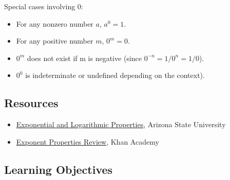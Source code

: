 Special cases involving 0:



\begin{itemize}
    \item For any nonzero number $a$, $a^0 = 1$.
    \item For any positive number $m$, $0^m = 0$.
    \item $0^m$ does not exist if m is negative (since $0^{-n} = 1/0^n = 1/0$).
    \item $0^0$ is indeterminate or undefined depending on the context).
\end{itemize}


\subsection{Resources}
\label{sss:reso-55b5}




\begin{itemize}
    \item \href{https://tutoring.asu.edu/sites/default/files/exponentialandlogrithmicproperties.pdf}{Exponential and Logarithmic Properties}, Arizona State University
    \item \href{https://www.khanacademy.org/math/cc-eighth-grade-math/cc-8th-numbers-operations/cc-8th-exponent-properties/a/exponent-properties-review}{Exponent Properties Review}, Khan Academy
\end{itemize}


\subsection{Learning Objectives}
\label{ssec:lear-fe6e}


